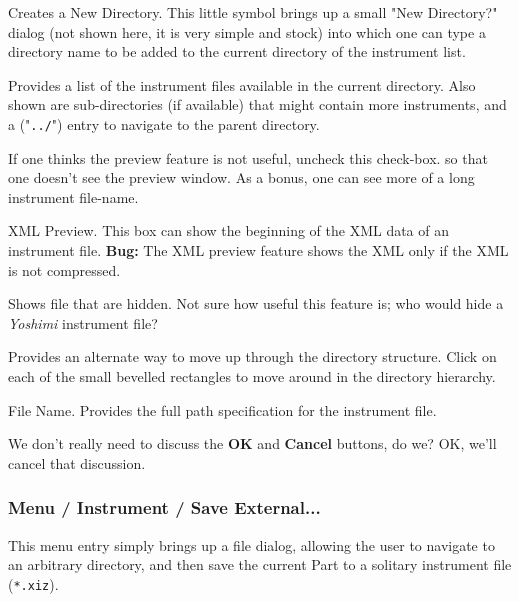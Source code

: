    Creates a New Directory.
   This little symbol brings up a small "New Directory?" dialog (not shown
   here, it is very simple and stock) into which one can type a directory
   name to be added to the current directory of the instrument list.

   Provides a list of the instrument files available in the current
   directory.  Also shown are sub-directories (if available)
   that might contain more instruments, and a ("\texttt{../}") entry
   to navigate to the parent directory.

   If one thinks the preview feature is not useful, uncheck this check-box.
   so that one doesn't see the preview window.  As a bonus, one can see more
   of a long instrument file-name.

   XML Preview.
   This box can show the beginning of the XML data of an instrument file.
   \textbf{Bug:}
   The XML preview feature shows the XML only if the XML is not compressed.

   Shows file that are hidden.  Not sure how useful this feature is;
   who would hide a \textsl{Yoshimi} instrument file?

   Provides an alternate way to move up through the directory structure.
   Click on each of the small bevelled rectangles to move around in the
   directory hierarchy.

   File Name.
   Provides the full path specification for the instrument file.

   We don't really need to discuss the \textbf{OK} and \textbf{Cancel}
   buttons, do we?  OK, we'll cancel that discussion.
\fi
\subsubsection{Menu / Instrument / Save External...}
\label{subsubsec:menu_instrument_save}

   This menu entry simply brings up a file dialog, allowing the user to
   navigate to an arbitrary directory, and then save the current Part
   to a solitary instrument file (\texttt{*.xiz}).

